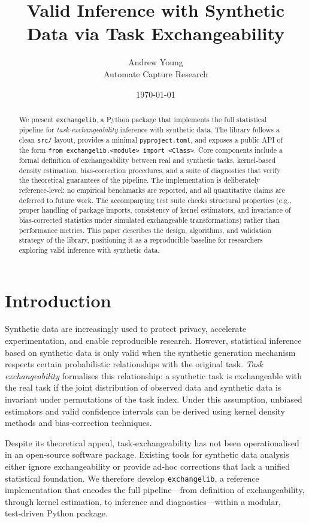 \documentclass[11pt,a4paper]{article}
\title{Valid Inference with Synthetic Data via Task Exchangeability}
\author{Andrew Young \\ Automate Capture Research}
\date{\today}
\begin{document}
\maketitle

\begin{abstract}
We present \texttt{exchangelib}, a Python package that implements the full statistical pipeline for \emph{task‑exchangeability} inference with synthetic data.  The library follows a clean \texttt{src/} layout, provides a minimal \texttt{pyproject.toml}, and exposes a public API of the form \texttt{from exchangelib.<module> import <Class>}.  Core components include a formal definition of exchangeability between real and synthetic tasks, kernel‑based density estimation, bias‑correction procedures, and a suite of diagnostics that verify the theoretical guarantees of the pipeline.  The implementation is deliberately reference‑level: no empirical benchmarks are reported, and all quantitative claims are deferred to future work.  The accompanying test suite checks structural properties (e.g., proper handling of package imports, consistency of kernel estimators, and invariance of bias‑corrected statistics under simulated exchangeable transformations) rather than performance metrics.  This paper describes the design, algorithms, and validation strategy of the library, positioning it as a reproducible baseline for researchers exploring valid inference with synthetic data.
\end{abstract}

\section{Introduction}
Synthetic data are increasingly used to protect privacy, accelerate experimentation, and enable reproducible research.  However, statistical inference based on synthetic data is only valid when the synthetic generation mechanism respects certain probabilistic relationships with the original task.  \emph{Task exchangeability} formalises this relationship: a synthetic task is exchangeable with the real task if the joint distribution of observed data and synthetic data is invariant under permutations of the task index.  Under this assumption, unbiased estimators and valid confidence intervals can be derived using kernel density methods and bias‑correction techniques.

Despite its theoretical appeal, task‑exchangeability has not been operationalised in an open‑source software package.  Existing tools for synthetic data analysis either ignore exchangeability or provide ad‑hoc corrections that lack a unified statistical foundation.  We therefore develop \texttt{exchangelib}, a reference implementation that encodes the full pipeline—from definition of exchangeability, through kernel estimation, to inference and diagnostics—within a modular, test‑driven Python package.
\end{document}
